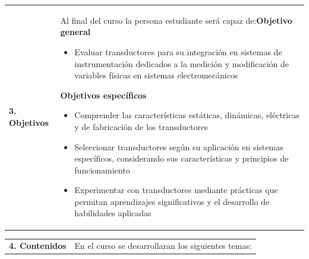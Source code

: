 \documentclass[letterpaper]{article}%
\begin{document}
\begin{tabularx}{\textwidth}{p{3cm}p{13cm}}%
\par\fontsize{12}{14}\selectfont \textbf{\textcolor{parte}{3. Objetivos}}&Al final del curso la persona estudiante será capaz de:\newline\newline \textbf{Objetivo general}\begin{itemize}\item Evaluar transductores para su integración en sistemas de instrumentación dedicados a la medición y modificación de variables físicas en sistemas electromecánicos\end{itemize} \vspace{2mm}\textbf{Objetivos específicos}\begin{itemize}\item Comprender las características estáticas, dinámicas, eléctricas y de fabricación de los transductores\item Seleccionar transductores según su aplicación en sistemas específicos, considerando sus características y principios de funcionamiento\item Experimentar con transductores mediante prácticas que permitan aprendizajes significativos y el desarrollo de habilidades aplicadas\end{itemize}\\%
\end{tabularx}%
\vspace*{4mm}%
\newline%
\begin{tabularx}{\textwidth}{p{3cm}p{13cm}}%
\par\fontsize{12}{14}\selectfont \textbf{\textcolor{parte}{4. Contenidos}}&En el curso se desarrollaran los siguientes temas:\\%
\end{tabularx}%
\newline%
\end{document}
